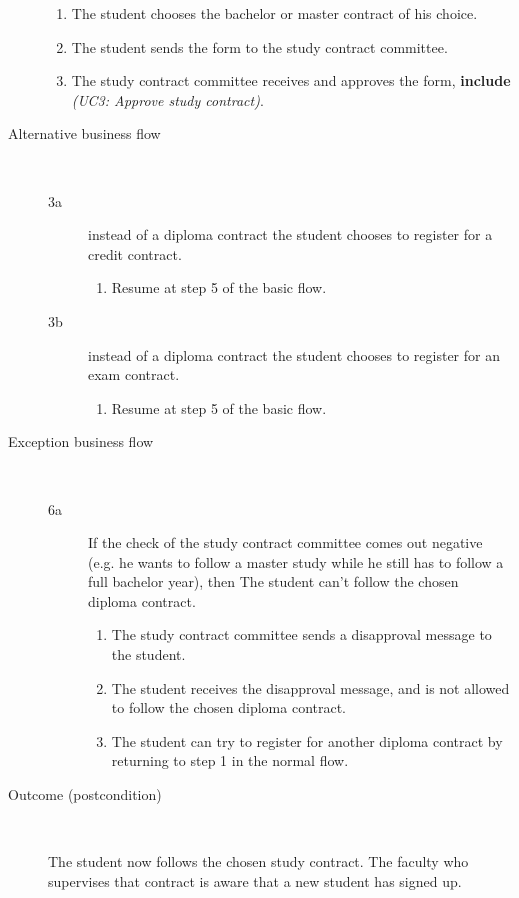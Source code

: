 \begin{description}
\begin{enumerate}
	  	\item The student chooses the bachelor or master contract of his choice.
	  	\item The student sends the form to the study contract committee.
	  	\item The study contract committee receives and approves the form,
	  	\textbf{include} \emph{(UC3: Approve study contract)}.
	\end{enumerate}
	\item[Alternative business flow] \ 
	\begin{description}
		\item[3a] instead of a diploma contract the student chooses to register for a
		credit contract. 
		\begin{enumerate}
		  \item Resume at step 5 of the basic flow.
		\end{enumerate}
		\item[3b] instead of a diploma contract the student chooses to register for an
		exam contract. 
		\begin{enumerate}
		  \item Resume at step 5 of the basic flow.
		\end{enumerate}
	\end{description}
	\item[Exception business flow] \ 
	\begin{description}
		\item[6a] If the check of the study contract committee comes out negative
		(e.g. he wants to follow a master study while he still has to follow a
		full bachelor year), then The student can't follow the chosen diploma contract.
		\begin{enumerate}		
		  \item The study contract committee sends a disapproval message to the
		  student.
		  \item The student receives the disapproval message, and is not allowed to
		  follow the chosen diploma contract.
		  \item The student can try to register for another diploma contract by
		  returning to step 1 in the normal flow.
		\end{enumerate}
	\end{description}
	\item[Outcome (postcondition)] \
		\par The student now follows the chosen study contract. The faculty who
		supervises that contract is aware that a new student has signed up.
\end{description}
